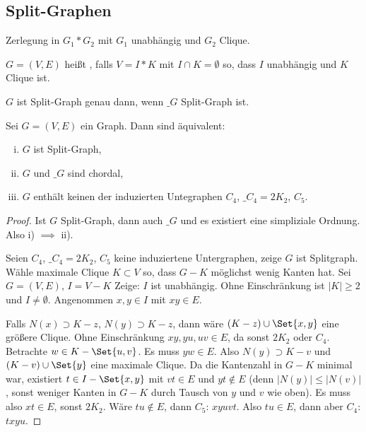 \subsection{Split-Graphen}

Zerlegung in $G_1 \ast G_2$ mit $G_1$ unabhängig und $G_2$ Clique.

\begin{df}
    $G = (V, E)$ heißt , falls $V = I \ast K$ mit $I \cap K = \emptyset$ so, dass $I$ unabhängig und $K$ Clique ist.
\end{df}

\begin{lem}
    $G$ ist Split-Graph genau dann, wenn $\_G$ Split-Graph ist.
\end{lem}

\begin{st}
    Sei $G = (V, E)$ ein Graph.
    Dann sind äquivalent:
    \begin{enumerate}[i)]
        \item
            $G$ ist Split-Graph,
        \item
            $G$ und $\_G$ sind chordal,
        \item
            $G$ enthält keinen der induzierten Untegraphen $C_4$, $\_{C_4} = 2 K_2$, $C_5$.
    \end{enumerate}
    \begin{proof}
        Ist $G$ Split-Graph, dann auch $\_G$ und es existiert eine simpliziale Ordnung.
        Also i) $\implies$ ii).

        Seien $C_4$, $\_{C_4} = 2 K_2$, $C_5$ keine induziertene Untergraphen, zeige $G$ ist Splitgraph.
        Wähle maximale Clique $K \subset V$ so, dass $G - K$ möglichst wenig Kanten hat.
        Sei $G = (V, E)$, $I = V - K$
        Zeige: $I$ ist unabhängig.
        Ohne Einschränkung ist $|K| \ge 2$ und $I \neq \emptyset$.
        Angenommen $x,y \in I$ mit $xy \in E$.

        Falls $N(x) \supset K - z$, $N(y) \supset K - z$, dann wäre $(K-z) \cup \Set{x,y}$ eine größere Clique.
        Ohne Einschränkung $xy, yu, uv \in E$, da sonst $2K_2$ oder $C_4$.
        Betrachte $w \in K - \Set{u,v}$.
        Es muss $yw \in E$.
        Also $N(y) \supset K - v$ und $(K-v) \cup \Set{y}$ eine maximale Clique.
        Da die Kantenzahl in $G - K$ minimal war, existiert $t \in I - \Set{x,y}$ mit $vt \in E$ und $yt \not\in E$ (denn $|N(y)| \le |N(v)|$, sonst weniger Kanten in $G - K$ durch Tausch von $y$ und $v$ wie oben).
        Es muss also $xt \in E$, sonst $2 K_2$.
        Wäre $tu \not\in E$, dann $C_5$: $xyuvt$.
        Also $tu \in E$, dann aber $C_4$: $txyu$.
    \end{proof}
\end{st}








